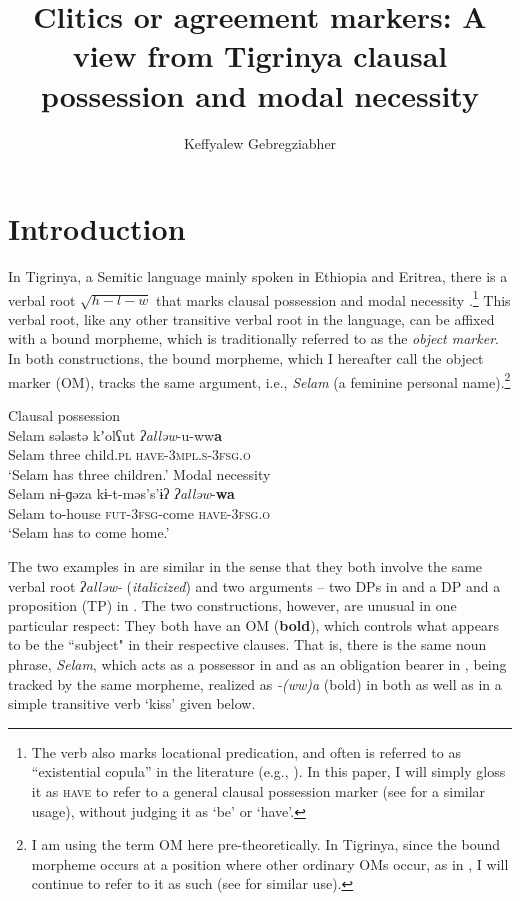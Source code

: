 \documentclass[output=paper]{langscibook}
\author{Keffyalew Gebregziabher\affiliation{University of Toronto}}
\title[Clitics or agreement markers]
      {Clitics or agreement markers: A view from Tigrinya clausal possession and modal necessity}
\begin{document}
\maketitle

\section{Introduction}
In Tigrinya, a Semitic language mainly spoken in Ethiopia and Eritrea, there is a verbal root $\sqrt{h-l-w}$ that marks clausal possession  and modal necessity .\footnote{The verb also marks locational predication, and often is referred to as ``existential copula'' in the literature (e.g., \citealt{hetzron1972}). In this paper, I will simply gloss it as {\scshape have} to refer to a general clausal possession marker (see \citealt{myler16} for a similar usage), without judging it as `be' or `have'.} This verbal root, like any other transitive verbal root in the language, can be affixed with a bound morpheme, which is traditionally referred to as the \emph{object marker}. In both constructions, the bound morpheme, which I hereafter call the object marker (OM), tracks the same argument, i.e., \emph{Selam} (a feminine personal name).\footnote{I am using the term OM here pre-theoretically. In Tigrinya, since the bound morpheme occurs at a position where other ordinary OMs occur, as in , I will continue to refer to it as such (see \citealt{kramer14} for similar use).}

\ea\label{ex:Gebregziabher:clause}
\ea\label{ex:Gebregziabher:ClP} Clausal possession \\
\gll Selam sələstə kʼolʕut \textit{ʔalləw}-u-ww\textbf{a} \\
Selam three child.{\scshape pl} {\scshape have-3mpl.s-3fsg.o}\\
\glt `Selam has three children.'
\ex\label{ex:Gebregziabher:MoN}  Modal necessity \\
\gll Selam nɨ-ɡəza kɨ-t-məs's'ɨʔ \textit{ʔalləw}-{\textbf{wa}} \\
Selam to-house {\scshape fut-3fsg}-come {\scshape have-3fsg.o}\\
\glt `Selam has to come home.'
\z
\z

\noindent The two examples in  are similar in the sense that they both involve the same verbal root \emph{ʔalləw-} (\textit{italicized}) and two arguments -- two DPs in  and a DP and a proposition (TP) in . The two constructions, however, are unusual in one particular respect: They both have an OM ({\textbf{bold}}), which controls what appears to be the ``subject" in their respective clauses. That is, there is the same noun phrase, \emph{Selam}, which acts as a possessor in  and as an obligation bearer in , being tracked by the same morpheme, realized as \emph{-(ww)a} (bold) in both as well as in a simple transitive verb `kiss' given below.
\end{document}

